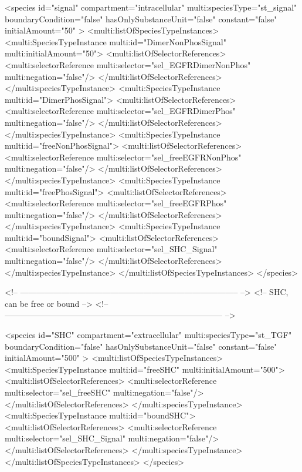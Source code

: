 \begin{example}
      <species id="signal" compartment="intracellular" multi:speciesType="st_signal"
               boundaryCondition="false" hasOnlySubstanceUnit="false" 
               constant="false" initialAmount="50" >
        <multi:listOfSpeciesTypeInstances>
          <multi:SpeciesTypeInstance multi:id="DimerNonPhosSignal" multi:initialAmount="50">
            <multi:listOfSelectorReferences>
              <multi:selectorReference multi:selector="sel_EGFRDimerNonPhos" multi:negation="false"/>
            </multi:listOfSelectorReferences>
          </multi:speciesTypeInstance>
          <multi:SpeciesTypeInstance multi:id="DimerPhosSignal">
            <multi:listOfSelectorReferences>
              <multi:selectorReference multi:selector="sel_EGFRDimerPhos" multi:negation="false"/>
            </multi:listOfSelectorReferences>
          </multi:speciesTypeInstance>
          <multi:SpeciesTypeInstance multi:id="freeNonPhosSignal">
            <multi:listOfSelectorReferences>
              <multi:selectorReference multi:selector="sel_freeEGFRNonPhos" multi:negation="false"/>
            </multi:listOfSelectorReferences>
          </multi:speciesTypeInstance>
          <multi:SpeciesTypeInstance multi:id="freePhosSignal">
            <multi:listOfSelectorReferences>
              <multi:selectorReference multi:selector="sel_freeEGFRPhos" multi:negation="false"/>
            </multi:listOfSelectorReferences>
          </multi:speciesTypeInstance>
           <multi:SpeciesTypeInstance multi:id="boundSignal">
            <multi:listOfSelectorReferences>
              <multi:selectorReference multi:selector="sel_SHC_Signal" multi:negation="false"/>
            </multi:listOfSelectorReferences>
          </multi:speciesTypeInstance>
       </multi:listOfSpeciesTypeInstances>
      </species>

<!-- -------------------------------------------------------------------------------- -->
<!-- SHC, can be free or bound                                                        -->
<!-- -------------------------------------------------------------------------------- -->

     <species id="SHC" compartment="extracellular" multi:speciesType="st_TGF"
               boundaryCondition="false" hasOnlySubstanceUnit="false" 
               constant="false" initialAmount="500" >
        <multi:listOfSpeciesTypeInstances>
          <multi:SpeciesTypeInstance multi:id="freeSHC" multi:initialAmount="500">
            <multi:listOfSelectorReferences>
              <multi:selectorReference multi:selector="sel_freeSHC" multi:negation="false"/>
            </multi:listOfSelectorReferences>
          </multi:speciesTypeInstance>
          <multi:SpeciesTypeInstance multi:id="boundSHC">
            <multi:listOfSelectorReferences>
              <multi:selectorReference multi:selector="sel_SHC_Signal" multi:negation="false"/>
            </multi:listOfSelectorReferences>
          </multi:speciesTypeInstance>
        </multi:listOfSpeciesTypeInstances>
      </species>



\end{example}
